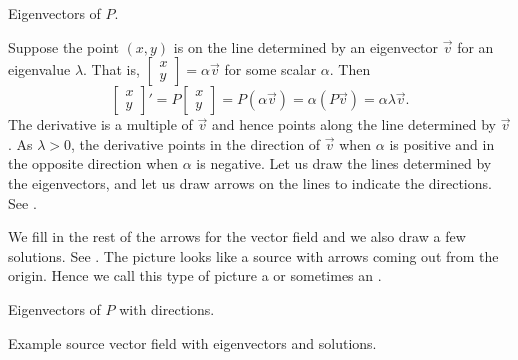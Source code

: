 \begin{mywrapfig}{3.25in}
\capstart
{}
\caption{Eigenvectors of $P$.\label{pln:source-eigfig}}
\end{mywrapfig}

Suppose the point $(x,y)$ is on the line determined by an eigenvector
$\vec{v}$ for an eigenvalue $\lambda$.
That is,
$\left[ \begin{smallmatrix} x \\ y \end{smallmatrix} \right] = \alpha \vec{v}$
for some scalar $\alpha$.
Then 
\begin{equation*}
\begin{bmatrix} x \\ y \end{bmatrix} '
=
P \begin{bmatrix} x \\ y \end{bmatrix}
=
P ( \alpha \vec{v} ) =  \alpha ( P \vec{v} )
= \alpha \lambda \vec{v} .
\end{equation*}
The derivative is a multiple of $\vec{v}$ and hence points along the
line determined by $\vec{v}$.  As $\lambda > 0$, the derivative points in the
direction of $\vec{v}$ when $\alpha$ is positive and in the opposite direction
when $\alpha$ is negative.  Let us draw the lines determined by
the eigenvectors, and let us draw
arrows on the lines to indicate the directions.
See .

We fill in the rest of the arrows for the vector field
and we also draw a few solutions.  See
.
The picture looks like a source
with arrows coming out from the origin.
Hence we call this type of picture a
\emph{} or sometimes an \emph{}.

\begin{myfig}
\parbox[t]{3.0in}{
 \capstart
 \caption{Eigenvectors of $P$ with directions.\label{pln:source-eig-arrfig}}
}
\quad
\parbox[t]{3.0in}{
 \capstart
 \caption{Example source vector field with eigenvectors and
 solutions.\label{pln:source-fullfig}}
}
\end{myfig}

\medskip

